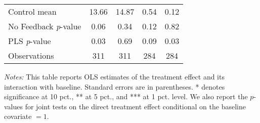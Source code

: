 \begin{table}[ht]
{\begin{threeparttable}
\begin{tabular}{l*{4}{c}}
Control mean    &    13.66         &    14.87         &     0.54         &     0.12         \\
No Feedback \emph{p}-value&     0.06         &     0.34         &     0.12         &     0.82         \\
PLS \emph{p}-value&     0.03         &     0.69         &     0.09         &     0.03         \\
Observations    &      311         &      311         &      284         &      284         \\
\bottomrule \end{tabular} \begin{tablenotes}[flushleft] \footnotesize \item \emph{Notes:} This table reports OLS estimates of the treatment effect and its interaction with baseline. Standard errors are in parentheses. * denotes significance at 10 pct., ** at 5 pct., and *** at 1 pct. level. We also report the \(p\)-values for joint tests on the direct treatment effect conditional on the baseline covariate $= 1$. \end{tablenotes} \end{threeparttable} } \end{table}

